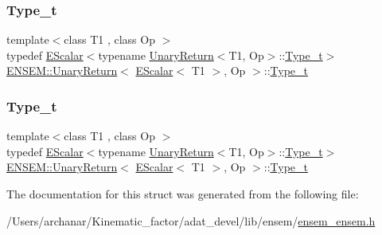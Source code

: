\subsubsection{\texorpdfstring{Type\_t}{Type\_t}\hspace{0.1cm}{\footnotesize\ttfamily [1/2]}}
{\footnotesize\ttfamily template$<$class T1 , class Op $>$ \\
typedef \mbox{\hyperlink{classENSEM_1_1EScalar}{E\+Scalar}}$<$typename \mbox{\hyperlink{structENSEM_1_1UnaryReturn}{Unary\+Return}}$<$T1, Op$>$\+::\mbox{\hyperlink{structENSEM_1_1UnaryReturn_3_01EScalar_3_01T1_01_4_00_01Op_01_4_acb8455aafdd37d1ee54a8dd81669fe24}{Type\+\_\+t}}$>$ \mbox{\hyperlink{structENSEM_1_1UnaryReturn}{E\+N\+S\+E\+M\+::\+Unary\+Return}}$<$ \mbox{\hyperlink{classENSEM_1_1EScalar}{E\+Scalar}}$<$ T1 $>$, Op $>$\+::\mbox{\hyperlink{structENSEM_1_1UnaryReturn_3_01EScalar_3_01T1_01_4_00_01Op_01_4_acb8455aafdd37d1ee54a8dd81669fe24}{Type\+\_\+t}}}

\mbox{\label{structENSEM_1_1UnaryReturn_3_01EScalar_3_01T1_01_4_00_01Op_01_4_acb8455aafdd37d1ee54a8dd81669fe24}} 
\subsubsection{\texorpdfstring{Type\_t}{Type\_t}\hspace{0.1cm}{\footnotesize\ttfamily [2/2]}}
{\footnotesize\ttfamily template$<$class T1 , class Op $>$ \\
typedef \mbox{\hyperlink{classENSEM_1_1EScalar}{E\+Scalar}}$<$typename \mbox{\hyperlink{structENSEM_1_1UnaryReturn}{Unary\+Return}}$<$T1, Op$>$\+::\mbox{\hyperlink{structENSEM_1_1UnaryReturn_3_01EScalar_3_01T1_01_4_00_01Op_01_4_acb8455aafdd37d1ee54a8dd81669fe24}{Type\+\_\+t}}$>$ \mbox{\hyperlink{structENSEM_1_1UnaryReturn}{E\+N\+S\+E\+M\+::\+Unary\+Return}}$<$ \mbox{\hyperlink{classENSEM_1_1EScalar}{E\+Scalar}}$<$ T1 $>$, Op $>$\+::\mbox{\hyperlink{structENSEM_1_1UnaryReturn_3_01EScalar_3_01T1_01_4_00_01Op_01_4_acb8455aafdd37d1ee54a8dd81669fe24}{Type\+\_\+t}}}



The documentation for this struct was generated from the following file\+:\begin{DoxyCompactItemize}
\item 
/\+Users/archanar/\+Kinematic\+\_\+factor/adat\+\_\+devel/lib/ensem/\mbox{\hyperlink{lib_2ensem_2ensem__ensem_8h}{ensem\+\_\+ensem.\+h}}\end{DoxyCompactItemize}

